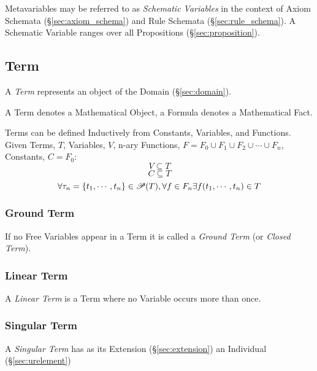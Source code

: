 Metavariables may be referred to as \emph{Schematic Variables} in the
context of Axiom Schemata (\S\ref{sec:axiom_schema}) and Rule Schemata
(\S\ref{sec:rule_schema}). A Schematic Variable ranges over all
Propositions (\S\ref{sec:proposition}).



\subsection{Term}\label{sec:term}

A \emph{Term} represents an object of the Domain (\S\ref{sec:domain}).

A Term denotes a Mathematical Object, a Formula denotes a Mathematical
Fact.

Terms can be defined Inductively from Constants, Variables, and
Functions. Given Terms, $T$, Variables, $V$, n-ary Functions, $F = F_0
\cup F_1 \cup F_2 \cup \cdots \cup F_n$, Constants, $C = F_0$:
\[
  V \subseteq T
\]\[
  C \subseteq T
\]\[
  \forall \tau_n=\{t_1,\cdots,t_n\} \in \mathscr{P}(T), \forall f
  \in F_n \exists f(t_1,\cdots,t_n) \in T
\]



\subsubsection{Ground Term}\label{sec:ground_term}

If no Free Variables appear in a Term it is called a \emph{Ground
  Term} (or \emph{Closed Term}).



\subsubsection{Linear Term}\label{sec:linear_term}

A \emph{Linear Term} is a Term where no Variable occurs more than
once.



\subsubsection{Singular Term}\label{sec:singular_term}
\cite{chalmers02}

A \emph{Singular Term} has as its Extension (\S\ref{sec:extension}) an
Individual (\S\ref{sec:urelement})



